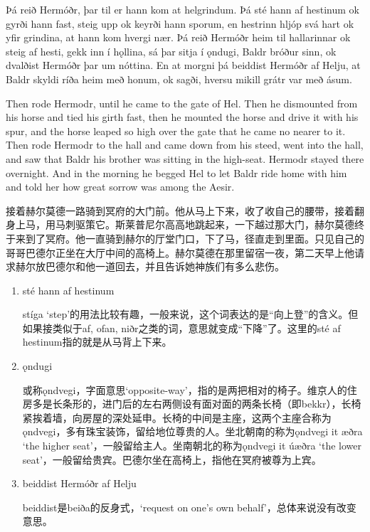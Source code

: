 \begin{paracol}{2}
    Þá reið Hermóðr, þar til er hann kom at helgrindum. Þá sté hann af hestinum ok gyrði hann fast, steig upp ok keyrði hann sporum, en hestrinn hljóp svá hart ok yfir grindina, at hann kom hvergi nær. Þá reið Hermóðr heim til hallarinnar ok steig af hesti, gekk inn í hǫllina, sá þar sitja í ǫndugi, Baldr bróður sinn, ok dvalðist Hermóðr þar um nóttina. En at morgni þá beiddist Hermóðr af Helju, at Baldr skyldi ríða heim með honum, ok sagði, hversu mikill grátr var með ásum.

    \switchcolumn

    Then rode Hermodr, until he came to the gate of Hel. Then he dismounted from his horse and tied his girth fast, then he mounted the horse and drive it with his spur, and the horse leaped so high over the gate that he came no nearer to it. Then rode Hermodr to the hall and came down from his steed, went into the hall, and saw that Baldr his brother was sitting in the high-seat. Hermodr stayed there overnight. And in the morning he begged Hel to let Baldr ride home with him and told her how great sorrow was among the Aesir.
\end{paracol}
\begin{translation*}{}
    接着赫尔莫德一路骑到冥府的大门前。他从马上下来，收了收自己的腰带，接着翻身上马，用马刺驱策它。斯莱普尼尔高高地跳起来，一下越过那大门，赫尔莫德终于来到了冥府。他一直骑到赫尔的厅堂门口，下了马，径直走到里面。只见自己的哥哥巴德尔正坐在大厅中间的高椅上。赫尔莫德在那里留宿一夜，第二天早上他请求赫尔放巴德尔和他一道回去，并且告诉她神族们有多么悲伤。
\end{translation*}
\begin{grammar*}{}
    \begin{enumerate}[leftmargin=*]
        \item sté hann af hestinum

              stíga `step'的用法比较有趣，一般来说，这个词表达的是“向上登”的含义。但如果接类似于af, ofan, niðr之类的词，意思就变成“下降”了。这里的sté af hestinum指的就是从马背上下来。

        \item ǫndugi

              或称ǫndvegi，字面意思`opposite-way'，指的是两把相对的椅子。维京人的住房多是长条形的，进门后的左右两侧设有面对面的两条长椅（即bekkr），长椅紧挨着墙，向房屋的深处延申。长椅的中间是主座，这两个主座合称为ǫndvegi，多有珠宝装饰，留给地位尊贵的人。坐北朝南的称为ǫndvegi it æðra `the higher seat'，一般留给主人。坐南朝北的称为ǫndvegi it úæðra `the lower seat'，一般留给贵宾。巴德尔坐在高椅上，指他在冥府被尊为上宾。

        \item beiddist Hermóðr af Helju

              beiddist是beiða的反身式，`request on one's own behalf'，总体来说没有改变意思。
    \end{enumerate}
\end{grammar*}
